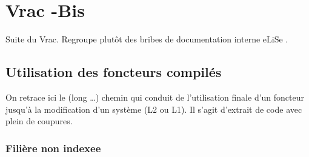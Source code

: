 \chapter{Vrac -Bis }

Suite du Vrac. Regroupe plut\^ot des  bribes de documentation interne
eLiSe .


\section{Utilisation des foncteurs compil\'es}

On retrace ici le (long \dots) chemin qui conduit de l'utilisation
finale d'un foncteur jusqu'\`a la modification d'un syst\`eme (L2 ou L1).
Il s'agit d'extrait de code avec plein de coupures.

\subsection {Fili\`ere non indexee}

